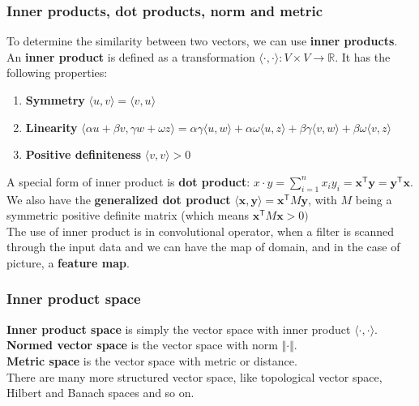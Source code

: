\documentclass[12pt]{article}
\begin{document}
\subsubsection*{Inner products, dot products, norm and metric}
To determine the similarity between two vectors, we can  use \textbf{inner products}.\\
An \textbf{inner product} is defined as a transformation $\langle \cdot ,\cdot\rangle: V \times V \rightarrow \mathbb{R} $. It has the following properties:
\begin{enumerate}
\item \textbf{Symmetry} $\langle u ,v \rangle = \langle v ,u\rangle$
\item \textbf{Linearity} $\langle \alpha u + \beta v ,\gamma w + \omega z\rangle = \alpha\gamma \langle u ,w\rangle + \alpha \omega \langle u,z\rangle + \beta \gamma\langle v ,w\rangle + \beta \omega \langle v ,z\rangle$
\item \textbf{Positive definiteness} $\langle v,v\rangle > 0$
\end{enumerate}
A special form of inner product is \textbf{dot product}: $x\cdot y = \sum_{i=1}^{n} x_iy_i= \mathbf x^\textsf{T}\mathbf y=\mathbf y^\textsf{T}\mathbf x$. We also have the \textbf{generalized dot product} $\langle \textbf{x} ,\textbf{y}\rangle = \textbf{x}^\textsf{T}M\textbf{y}$, with $M$ being a symmetric positive definite matrix (which means $\textbf{x}^\textsf{T}M\textbf{x} > 0)$ \\
The use of inner product is in convolutional operator, when a filter is scanned through the input data and we can have the map of domain, and in the case of picture, a \textbf{feature map}.



\subsubsection*{Inner product space}
\textbf{Inner product space} is simply the vector space with inner product $\langle \cdot ,\cdot\rangle$.\\
\textbf{Normed vector space} is the vector space with norm $\Vert \cdot \Vert$.\\
\textbf{Metric space} is the vector space with metric or distance.\\
There are many more structured vector space, like topological vector space, Hilbert and Banach spaces and so on.


\end{document}
